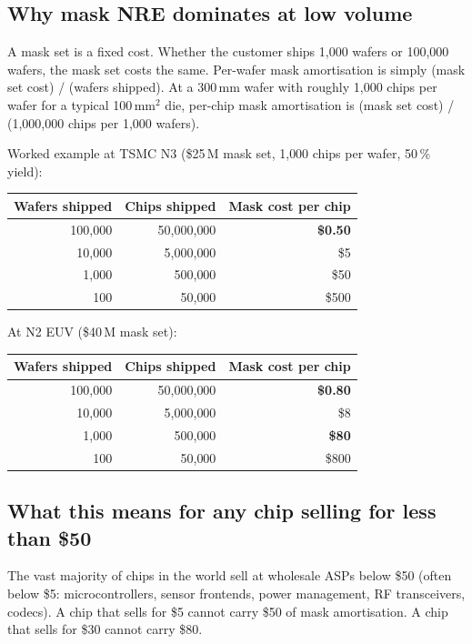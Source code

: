 \documentclass[11pt,letterpaper]{article}
\begin{document}
\subsection{Why mask NRE dominates at low volume}

A mask set is a fixed cost. Whether the customer ships 1{,}000 wafers or 100{,}000 wafers, the mask set costs the same. Per-wafer mask amortisation is simply (mask set cost) / (wafers shipped). At a 300\,mm wafer with roughly 1{,}000 chips per wafer for a typical 100\,mm$^2$ die, per-chip mask amortisation is (mask set cost) / (1{,}000{,}000 chips per 1{,}000 wafers).

Worked example at TSMC N3 (\$25\,M mask set, 1{,}000 chips per wafer, 50\,\% yield):

\begin{center}
\begin{tabular}{rrr}
\toprule
Wafers shipped & Chips shipped & Mask cost per chip \\
\midrule
100{,}000 & 50{,}000{,}000 & \textbf{\$0.50} \\
10{,}000 & 5{,}000{,}000 & \$5 \\
1{,}000 & 500{,}000 & \$50 \\
100 & 50{,}000 & \$500 \\
\bottomrule
\end{tabular}
\end{center}

At N2 EUV (\$40\,M mask set):

\begin{center}
\begin{tabular}{rrr}
\toprule
Wafers shipped & Chips shipped & Mask cost per chip \\
\midrule
100{,}000 & 50{,}000{,}000 & \textbf{\$0.80} \\
10{,}000 & 5{,}000{,}000 & \$8 \\
1{,}000 & 500{,}000 & \textbf{\$80} \\
100 & 50{,}000 & \$800 \\
\bottomrule
\end{tabular}
\end{center}

\subsection{What this means for any chip selling for less than \$50}

The vast majority of chips in the world sell at wholesale ASPs below \$50 (often below \$5: microcontrollers, sensor frontends, power management, RF transceivers, codecs). A chip that sells for \$5 cannot carry \$50 of mask amortisation. A chip that sells for \$30 cannot carry \$80.
\end{document}
